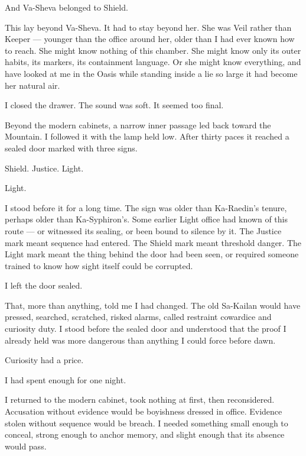 And Va-Sheva belonged to Shield.\par

This lay beyond Va-Sheva. It had to stay beyond her. She was Veil rather than Keeper --- younger than the office around her, older than I had ever known how to reach. She might know nothing of this chamber. She might know only its outer habits, its markers, its containment language. Or she might know everything, and have looked at me in the Oasis while standing inside a lie so large it had become her natural air.\par

I closed the drawer. The sound was soft. It seemed too final.\par

Beyond the modern cabinets, a narrow inner passage led back toward the Mountain. I followed it with the lamp held low. After thirty paces it reached a sealed door marked with three signs.\par

Shield. Justice. Light.\par

Light.\par

I stood before it for a long time. The sign was older than Ka-Raedin's tenure, perhaps older than Ka-Syphiron's. Some earlier Light office had known of this route --- or witnessed its sealing, or been bound to silence by it. The Justice mark meant sequence had entered. The Shield mark meant threshold danger. The Light mark meant the thing behind the door had been seen, or required someone trained to know how sight itself could be corrupted.\par

I left the door sealed.\par

That, more than anything, told me I had changed. The old Sa-Kailan would have pressed, searched, scratched, risked alarms, called restraint cowardice and curiosity duty. I stood before the sealed door and understood that the proof I already held was more dangerous than anything I could force before dawn.\par

Curiosity had a price.\par

I had spent enough for one night.\par

I returned to the modern cabinet, took nothing at first, then reconsidered. Accusation without evidence would be boyishness dressed in office. Evidence stolen without sequence would be breach. I needed something small enough to conceal, strong enough to anchor memory, and slight enough that its absence would pass.\par

